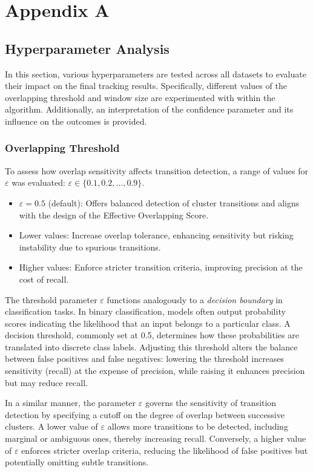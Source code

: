 \chapter{Appendix A}

\section{Hyperparameter Analysis}\label{sec:hyperparameter_analysis}
In this section, various hyperparameters are tested across all datasets to
evaluate their impact on the final tracking results. Specifically, different
values of the overlapping threshold and window size are experimented with
within the algorithm. Additionally, an interpretation of the confidence
parameter and its influence on the outcomes is provided.

\subsection{Overlapping Threshold}
To assess how overlap sensitivity affects transition detection, a range of
values for $\varepsilon$ was evaluated: $\varepsilon \in \{0.1, 0.2, \dots, 0.9\}$.

\begin{itemize}
      \item $\varepsilon = 0.5$ (default): Offers balanced detection of cluster
            transitions and aligns with the design of the Effective Overlapping Score.
      \item Lower values: Increase overlap tolerance, enhancing sensitivity but risking
            instability due to spurious transitions.
      \item Higher values: Enforce stricter transition criteria, improving precision at the
            cost of recall.
\end{itemize}

The threshold parameter $\varepsilon$ functions analogously to a \emph{decision
      boundary} in classification tasks. In binary classification, models often
output probability scores indicating the likelihood that an input belongs to a
particular class. A decision threshold, commonly set at 0.5, determines how
these probabilities are translated into discrete class labels. Adjusting this
threshold alters the balance between false positives and false negatives:
lowering the threshold increases sensitivity (recall) at the expense of
precision, while raising it enhances precision but may reduce recall.

In a similar manner, the parameter $\varepsilon$ governs the sensitivity of
transition detection by specifying a cutoff on the degree of overlap between
successive clusters. A lower value of $\varepsilon$ allows more transitions to be
detected, including marginal or ambiguous ones, thereby increasing recall.
Conversely, a higher value of $\varepsilon$ enforces stricter overlap criteria,
reducing the likelihood of false positives but potentially omitting subtle
transitions.

